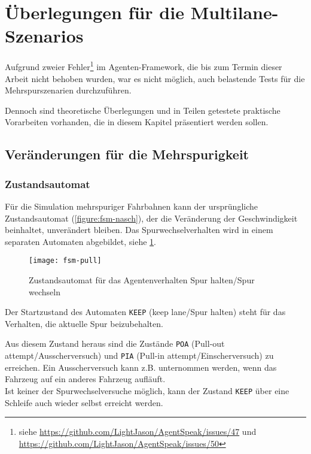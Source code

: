 \section{Überlegungen für die Multilane-Szenarios}
\label{sec:ueberlegungen-multilane}

Aufgrund zweier Fehler\footnote{siehe \url{https://github.com/LightJason/AgentSpeak/issues/47} und \url{https://github.com/LightJason/AgentSpeak/issues/50}} im Agenten-Framework, die bis zum Termin dieser Arbeit nicht behoben wurden, war es nicht möglich, auch belastende Tests für die Mehrspurszenarien durchzuführen.

Dennoch sind theoretische Überlegungen und in Teilen getestete praktische Vorarbeiten vorhanden, die in diesem Kapitel präsentiert werden sollen.





\subsection{Veränderungen für die Mehrspurigkeit}
\label{sec:multilane-change}


\subsubsection{Zustandsautomat}

Für die Simulation mehrspuriger Fahrbahnen kann der ursprüngliche Zustandsautomat (\cref{figure:fsm-nasch}), der die Veränderung der Geschwindigkeit beinhaltet, unverändert bleiben.
Das Spurwechselverhalten wird in einem separaten Automaten abgebildet, siehe \cref{figure:fsm-pull}.

\begin{figure}[hptb]
 \centering
 \texttt{[image: fsm-pull]}
 \caption[Zustandsautomat für das Spurverhalten]
 		{Zustandsautomat für das Agentenverhalten Spur halten/Spur wechseln}
 \label{figure:fsm-pull}
\end{figure}

Der Startzustand des Automaten \texttt{KEEP} (keep lane/Spur halten) steht für das Verhalten, die aktuelle Spur beizubehalten.

Aus diesem Zustand heraus sind die Zustände \texttt{POA} (Pull-out attempt/Ausscherversuch) und \texttt{PIA} (Pull-in attempt/Einscherversuch) zu erreichen.
Ein Ausscherversuch kann z.B. unternommen werden, wenn das Fahrzeug auf ein anderes Fahrzeug aufläuft.
\\
Ist keiner der Spurwechselversuche möglich, kann der Zustand \texttt{KEEP} über eine Schleife auch wieder selbst erreicht werden.

